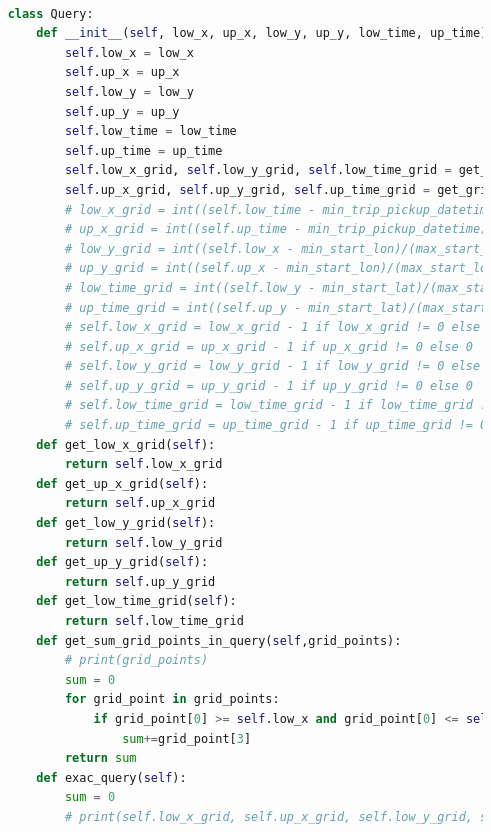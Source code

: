 \documentclass{article}
\begin{document}
\begin{lstlisting}[language=Python, caption=Task 2, label=task2, breaklines=true]
    
    class Query:
        def __init__(self, low_x, up_x, low_y, up_y, low_time, up_time):
            self.low_x = low_x
            self.up_x = up_x
            self.low_y = low_y
            self.up_y = up_y
            self.low_time = low_time
            self.up_time = up_time
            self.low_x_grid, self.low_y_grid, self.low_time_grid = get_grid_loc(low_time, low_x, low_y)
            self.up_x_grid, self.up_y_grid, self.up_time_grid = get_grid_loc(up_time, up_x, up_y)
            # low_x_grid = int((self.low_time - min_trip_pickup_datetime)/(max_trip_pickup_datetime - min_trip_pickup_datetime+0.000001)*grid_size)
            # up_x_grid = int((self.up_time - min_trip_pickup_datetime)/(max_trip_pickup_datetime - min_trip_pickup_datetime+0.000001)*grid_size)
            # low_y_grid = int((self.low_x - min_start_lon)/(max_start_lon - min_start_lon+0.000001)*grid_size)
            # up_y_grid = int((self.up_x - min_start_lon)/(max_start_lon - min_start_lon+0.000001)*grid_size)
            # low_time_grid = int((self.low_y - min_start_lat)/(max_start_lat - min_start_lat+0.000001)*grid_size)
            # up_time_grid = int((self.up_y - min_start_lat)/(max_start_lat - min_start_lat+0.000001)*grid_size)
            # self.low_x_grid = low_x_grid - 1 if low_x_grid != 0 else 0
            # self.up_x_grid = up_x_grid - 1 if up_x_grid != 0 else 0
            # self.low_y_grid = low_y_grid - 1 if low_y_grid != 0 else 0
            # self.up_y_grid = up_y_grid - 1 if up_y_grid != 0 else 0
            # self.low_time_grid = low_time_grid - 1 if low_time_grid != 0 else 0
            # self.up_time_grid = up_time_grid - 1 if up_time_grid != 0 else 0
        def get_low_x_grid(self):
            return self.low_x_grid
        def get_up_x_grid(self):
            return self.up_x_grid
        def get_low_y_grid(self):
            return self.low_y_grid
        def get_up_y_grid(self):
            return self.up_y_grid
        def get_low_time_grid(self):
            return self.low_time_grid
        def get_sum_grid_points_in_query(self,grid_points):
            # print(grid_points)
            sum = 0
            for grid_point in grid_points:
                if grid_point[0] >= self.low_x and grid_point[0] <= self.up_x and grid_point[1] >= self.low_y and grid_point[1] <= self.up_y and grid_point[2] >= self.low_time and grid_point[2] <= self.up_time:
                    sum+=grid_point[3]
            return sum
        def exac_query(self):
            sum = 0
            # print(self.low_x_grid, self.up_x_grid, self.low_y_grid, self.up_y_grid, self.low_time_grid, self.up_time_grid)

\end{lstlisting}
\end{document}
